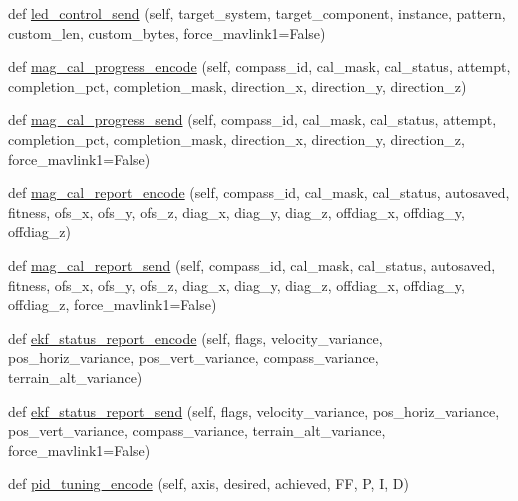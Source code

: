 \begin{DoxyCompactItemize}
\item 
def \hyperlink{classpymavlink_1_1dialects_1_1v10_1_1MAVLink_aa357ce4b63e163c469bdeda40ecb217f}{led\+\_\+control\+\_\+send} (self, target\+\_\+system, target\+\_\+component, instance, pattern, custom\+\_\+len, custom\+\_\+bytes, force\+\_\+mavlink1=False)
\item 
def \hyperlink{classpymavlink_1_1dialects_1_1v10_1_1MAVLink_a7ee70d2033ff7f5def8443585f95b2da}{mag\+\_\+cal\+\_\+progress\+\_\+encode} (self, compass\+\_\+id, cal\+\_\+mask, cal\+\_\+status, attempt, completion\+\_\+pct, completion\+\_\+mask, direction\+\_\+x, direction\+\_\+y, direction\+\_\+z)
\item 
def \hyperlink{classpymavlink_1_1dialects_1_1v10_1_1MAVLink_ada1a421e3ec9ea22243a17ee9284d924}{mag\+\_\+cal\+\_\+progress\+\_\+send} (self, compass\+\_\+id, cal\+\_\+mask, cal\+\_\+status, attempt, completion\+\_\+pct, completion\+\_\+mask, direction\+\_\+x, direction\+\_\+y, direction\+\_\+z, force\+\_\+mavlink1=False)
\item 
def \hyperlink{classpymavlink_1_1dialects_1_1v10_1_1MAVLink_a12ea162841832df32f386c4e1ff8fc4f}{mag\+\_\+cal\+\_\+report\+\_\+encode} (self, compass\+\_\+id, cal\+\_\+mask, cal\+\_\+status, autosaved, fitness, ofs\+\_\+x, ofs\+\_\+y, ofs\+\_\+z, diag\+\_\+x, diag\+\_\+y, diag\+\_\+z, offdiag\+\_\+x, offdiag\+\_\+y, offdiag\+\_\+z)
\item 
def \hyperlink{classpymavlink_1_1dialects_1_1v10_1_1MAVLink_ad3f38959e98a6091889f68a5e7d6e2a6}{mag\+\_\+cal\+\_\+report\+\_\+send} (self, compass\+\_\+id, cal\+\_\+mask, cal\+\_\+status, autosaved, fitness, ofs\+\_\+x, ofs\+\_\+y, ofs\+\_\+z, diag\+\_\+x, diag\+\_\+y, diag\+\_\+z, offdiag\+\_\+x, offdiag\+\_\+y, offdiag\+\_\+z, force\+\_\+mavlink1=False)
\item 
def \hyperlink{classpymavlink_1_1dialects_1_1v10_1_1MAVLink_a05690382b83a4f3e13ef596d03a8d8fb}{ekf\+\_\+status\+\_\+report\+\_\+encode} (self, flags, velocity\+\_\+variance, pos\+\_\+horiz\+\_\+variance, pos\+\_\+vert\+\_\+variance, compass\+\_\+variance, terrain\+\_\+alt\+\_\+variance)
\item 
def \hyperlink{classpymavlink_1_1dialects_1_1v10_1_1MAVLink_a328f8995f6ebd14f922f6fb656c3f71c}{ekf\+\_\+status\+\_\+report\+\_\+send} (self, flags, velocity\+\_\+variance, pos\+\_\+horiz\+\_\+variance, pos\+\_\+vert\+\_\+variance, compass\+\_\+variance, terrain\+\_\+alt\+\_\+variance, force\+\_\+mavlink1=False)
\item 
def \hyperlink{classpymavlink_1_1dialects_1_1v10_1_1MAVLink_a11aa75e792bd584e7c3f649e5a8c1ad8}{pid\+\_\+tuning\+\_\+encode} (self, axis, desired, achieved, FF, P, I, D)

\end{DoxyCompactItemize}
